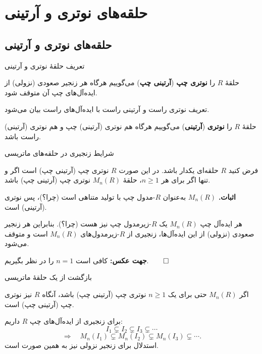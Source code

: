 \section{حلقه‌های نوتری و آرتینی}
\subsection*{حلقه‌های نوتری و آرتینی}

\begin{frame}[t]{تعریف حلقهٔ نوتری و آرتینی}
    \label{lec12:chain-definitions}
    \begin{definition}
        حلقهٔ $R$ را \textbf{نوتری چپ} (\textbf{آرتینی چپ}) می‌گوییم هرگاه هر زنجیر
        صعودی (نزولی) از ایده‌آل‌های چپ آن متوقف شود.
    \end{definition}
    \medskip
    تعریف نوتری راست و آرتینی راست با ایده‌آل‌های راست بیان می‌شود.
    \begin{definition}
        حلقهٔ $R$ را \textbf{نوتری} (\textbf{آرتینی}) می‌گوییم هرگاه هم نوتری
        (آرتینی) چپ و هم نوتری (آرتینی) راست باشد.
    \end{definition}
\end{frame}

\begin{frame}[t]{شرایط زنجیری در حلقه‌های ماتریسی}
    \label{lec12:matrix-chain-conditions}
    \begin{theorem}
        فرض کنید $R$ حلقه‌ای یکدار باشد. در این صورت $R$ نوتری چپ (آرتینی چپ)
        است اگر و تنها اگر برای هر $n\geq1$، حلقهٔ $M_n(R)$ نوتری چپ (آرتینی چپ) باشد.
    \end{theorem}
    \textbf{اثبات.}
    $M_n(R)$ به‌عنوان $R$-مدول چپ با تولید متناهی است (چرا؟)، پس نوتری (آرتینی) است.
    \medskip

    هر ایده‌آل چپ $M_n(R)$ یک $R$-زیرمدول چپ نیز هست (چرا؟).
    بنابراین هر زنجیر صعودی (نزولی) از این ایده‌آل‌ها، زنجیری از
    $R$-زیرمدول‌های $M_n(R)$ است و متوقف می‌شود.
    \medskip

    \textbf{جهت عکس:} کافی است $n=1$ را در نظر بگیریم.\hfill$\qed$
\end{frame}

\begin{frame}[t]{بازگشت از یک حلقهٔ ماتریسی}
    \label{lec12:matrix-single-size}
    \begin{remark}
        اگر $M_n(R)$ حتی برای یک $n\geq1$ نوتری چپ (آرتینی چپ) باشد،
        آنگاه $R$ نیز نوتری چپ (آرتینی چپ) است.
    \end{remark}
    برای زنجیری از ایده‌آل‌های چپ $R$ داریم:
    \[
        I_1\subsetneq I_2\subsetneq I_3\subsetneq\cdots
    \]
    \[
        \Longrightarrow\quad
        M_n(I_1)\subsetneq M_n(I_2)\subsetneq M_n(I_3)\subsetneq\cdots.
    \]
    استدلال برای زنجیر نزولی نیز به همین صورت است.
\end{frame}

